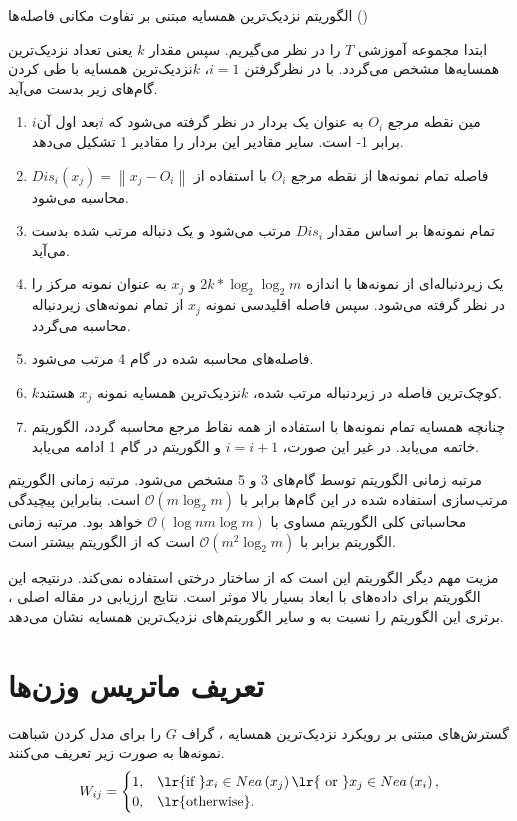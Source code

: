 \begin{algo}
	الگوریتم نزدیک‌ترین همسایه مبتنی بر تفاوت مکانی فاصله‌ها ()
	
	ابتدا مجموعه آموزشی $T$ را در نظر می‌گیریم. سپس مقدار $k$ یعنی تعداد نزدیک‌ترین همسایه‌ها مشخص می‌گردد. با در نظرگرفتن $i=1$،  $k$نزدیک‌ترین همسایه با طی کردن گام‌های زیر بدست می‌آید.
	
	\begin{enumerate}
		\item  $i$مین نقطه مرجع  $O_{i}$ به عنوان یک بردار در نظر گرفته می‌شود که   $i$بعد اول آن برابر 1- است. سایر مقادیر این بردار را مقادیر 1 تشکیل می‌دهد.
		\item 	فاصله تمام نمونه‌ها از نقطه مرجع $O_{i}$  با استفاده از $Dis_{i}(x_{j})=\left\|x_{j}-O_{i}\right\|$  محاسبه می‌شود.
		\item 	تمام نمونه‌ها بر اساس مقدار $Dis_{i}$  مرتب می‌شود و یک دنباله مرتب شده بدست می‌آید.
		\item 	یک زیردنباله‌ای از نمونه‌ها با اندازه  $2k*{{\log }_{2}}{{\log }_{2}}m$ و  $x_{j}$ به عنوان نمونه مرکز را در نظر گرفته می‌شود. سپس فاصله اقلیدسی نمونه  $x_{j}$ از تمام نمونه‌های زیردنباله محاسبه می‌گردد.
		\item فاصله‌های محاسبه شده در گام 4 مرتب می‌شود.
		\item  $k$کوچک‌ترین فاصله در زیردنباله مرتب شده،  $k$نزدیک‌ترین همسایه نمونه  $x_{j}$ هستند.
		\item چنانچه همسایه تمام نمونه‌ها با استفاده از همه نقاط مرجع محاسبه گردد، الگوریتم خاتمه می‌یابد. در غیر این صورت،  $i=i+1$ و الگوریتم در گام 1 ادامه می‌یابد.
	\end{enumerate}
\end{algo}

مرتبه زمانی الگوریتم  توسط گام‌های 3 و 5 مشخص می‌شود. مرتبه زمانی الگوریتم مرتب‌سازی استفاده شده در این گام‌ها برابر با   $\mathcal{O}(m{{\log }_{2}}m)$ است. بنابراین پیچیدگی محاسباتی کلی الگوریتم  مساوی با  $\mathcal{O}(\log nm\log m)$ خواهد بود. مرتبه زمانی الگوریتم  برابر با  $\mathcal{O}({{m}^{2}}{{\log }_{2}}m)$ است که از الگوریتم  بیشتر است.

مزیت مهم دیگر الگوریتم  این است که از ساختار درختی استفاده نمی‌کند. درنتیجه این الگوریتم برای داده‌های با ابعاد بسیار بالا موثر است. نتایج ارزیابی در مقاله اصلی \cite{xia2015}، برتری این الگوریتم را نسبت به  و سایر الگوریتم‌های نزدیک‌ترین همسایه نشان می‌دهد.

\section{تعریف ماتریس وزن‌ها}\label{sec:4:3}
گسترش‌های  مبتنی بر رویکرد نزدیک‌ترین همسایه \cite{ye2012,pan2015,xu2016}، گراف $G$ را برای مدل کردن شباهت نمونه‌ها به صورت زیر تعریف می‌کنند.
\begin{equation}\label{eq:4:1}
W_{ij} =
\begin{cases}
1, & \textrm{\lr{if }} x_i \in Nea\left(x_j\right) \textrm{\lr{ or }} x_j \in Nea\left(x_i\right),  \\
0, & \textrm{\lr{otherwise}}.
\end{cases}
\end{equation}

